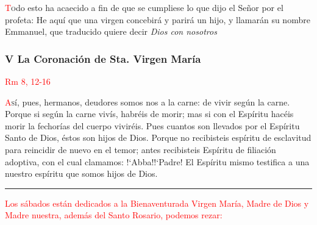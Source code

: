 \documentclass[10pt,twoside]{book}
\begin{document}
\begin{paracol}{2}
\begin{leftcolumn*}
            \lettrine[lines=2]{\textcolor{red}{T}}odo esto ha acaecido a fin de que se cumpliese lo que dijo el Señor por el profeta: He aquí que una virgen concebirá y parirá
            un hijo, y llamarán su nombre Emmanuel, que traducido quiere decir \textit{Dios con nosotros}

            
      \end{leftcolumn*}
      \begin{rightcolumn}
            \begin{center}
                  \subsubsection*{V La Coronación de Sta. Virgen María}
                  \textcolor{red}{Rm 8, 12-16}
            \end{center}

            \lettrine[lines=2]{\textcolor{red}{A}}sí, pues, hermanos, deudores somos nos a la carne: de vivir según la carne. Porque si según la carne vivís, habréis de morir; mas
            si con el Espíritu hacéis morir la fechorías del cuerpo viviréis. Pues cuantos son llevados por el Espíritu Santo de Dios, éstos son hijos de Dios. Porque no recibisteis
            espíritu de esclavitud para reincidir de nuevo en el temor; antes recibisteis Espíritu de filiación adoptiva, con el cual clamamos: {!`}Abba!{!`}Padre! El Espíritu mismo
            testifica a una nuestro espíritu que somos hijos de Dios.

            
      \end{rightcolumn}
\end{paracol}

\iralfinal

\begin{center}
      {\rule{10em}{0.4pt}}

      \vspace{0.75em}

      \textcolor{red}{Los sábados están dedicados a la Bienaventurada Virgen María, Madre de Dios y Madre nuestra, además del Santo Rosario, podemos rezar:}
\end{center}

\begin{multicols}{2}

      
      
\end{multicols}
\end{document}

